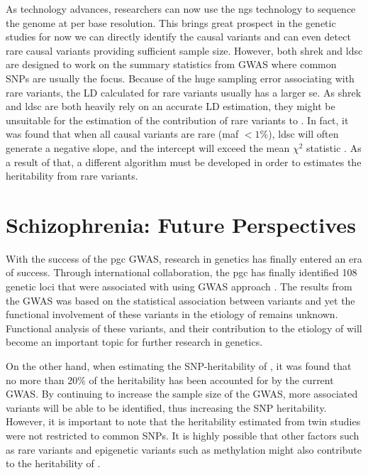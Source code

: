 \documentclass[12pt]{book}
\newcommand*{\glng}{\glsentrylong}
\begin{document}
	As technology advances, researchers can now use the \gls{ngs} technology to sequence the genome at per base resolution. 
	This brings great prospect in the genetic studies for now we can directly identify the causal variants and can even detect rare causal variants providing sufficient sample size. 
	However, both \gls{shrek} and \gls{ldsc} are designed to work on the summary statistics from \gls{GWAS} where common \glspl{SNP} are usually the focus. 
	Because of the huge sampling error associating with rare variants, the \gls{LD} calculated for rare variants usually has a larger \gls{se}.
	As \gls{shrek} and \gls{ldsc} are both heavily rely on an accurate \gls{LD} estimation, they might be unsuitable for the estimation of the contribution of rare variants to \glng{scz}. 
	In fact, it was found that when all causal variants are rare (\gls{maf} $<1\%$), \gls{ldsc} will often generate a negative slope, and the intercept will exceed the mean $\chi^2$ statistic \citep{Bulik-Sullivan2015}.
	As a result of that, a different algorithm must be developed in order to estimates the heritability from rare variants.
	
	\section{Schizophrenia: Future Perspectives}
	With the success of the \gls{pgc} \glng{scz} \gls{GWAS}, research in \glng{scz} genetics has finally entered an era of success.
	Through international collaboration, the \gls{pgc} has finally identified 108 genetic loci that were associated with \glng{scz} using \gls{GWAS} approach \citep{Ripke2014}.
	The results from the \gls{GWAS} was based on the statistical association between variants and \glng{scz} yet the functional involvement of these variants in the etiology of \glng{scz} remains unknown.
	Functional analysis of these variants, and their contribution to the etiology of \glng{scz} will become an important topic for further research in \glng{scz} genetics.
	
	On the other hand, when estimating the \gls{SNP}-heritability of \glng{scz}, it was found that no more than 20\% of the heritability has been accounted for by the current \gls{GWAS}.
	By continuing to increase the sample size of the \gls{GWAS}, more associated variants will be able to be identified, thus increasing the \gls{SNP} heritability. 
	However, it is important to note that the heritability estimated from twin studies were not restricted to common \glspl{SNP}. 
	It is highly possible that other factors such as rare variants and epigenetic variants such as methylation might also contribute to the heritability of \glng{scz}.
	
\end{document}
